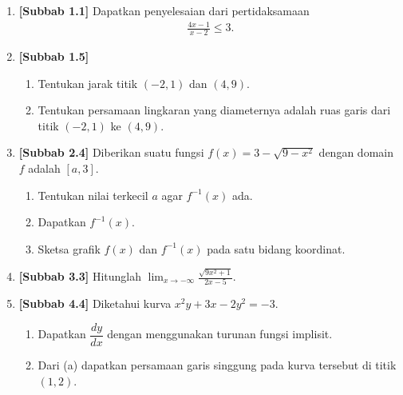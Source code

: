 \documentclass[10pt,openany,a4paper]{article}
\theoremstyle{definition}
\theoremstyle{definition}
\theoremstyle{plain}
\begin{document}
\begin{enumerate}
    \item \textbf{[Subbab 1.1]} Dapatkan penyelesaian dari pertidaksamaan
    \begin{align*}
        \frac{4x-1}{x-2}\leq 3.
    \end{align*}

    \item \textbf{[Subbab 1.5]} \begin{enumerate}
        \item Tentukan jarak titik $(-2,1)$ dan $(4,9)$.
        \item Tentukan persamaan lingkaran yang diameternya adalah ruas garis dari titik $(-2,1)$ ke $(4,9)$.
    \end{enumerate}

    \item \textbf{[Subbab 2.4]} Diberikan suatu fungsi $f(x)=3-\sqrt{9-x^2}$ dengan domain $f$ adalah $[a,3]$.
    \begin{enumerate}
        \item Tentukan nilai terkecil $a$ agar $f^{-1}(x)$ ada.
        \item Dapatkan $f^{-1}(x)$.
        \item Sketsa grafik $f(x)$ dan $f^{-1}(x)$ pada satu bidang koordinat.
    \end{enumerate}

    \item \textbf{[Subbab 3.3]} Hitunglah $\displaystyle\lim_{x\to-\infty}\frac{\sqrt{9x^2+1}}{2x-5}$.

    \item \textbf{[Subbab 4.4]} Diketahui kurva $x^2y+3x-2y^2=-3$.
    \begin{enumerate}
        \item Dapatkan $\dfrac{dy}{dx}$ dengan menggunakan turunan fungsi implisit.
        \item Dari (a) dapatkan persamaan garis singgung pada kurva tersebut di titik $(1,2)$.
    \end{enumerate}
\end{enumerate}

\newpage
\end{document}
